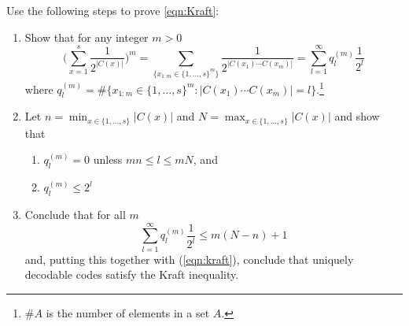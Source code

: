 \documentclass[11pt]{report}
\begin{document}
\begin{enumerate}[1.]
          Use the following steps to prove \ref{eqn:Kraft}:

          \begin{enumerate}

              \item Show that for any integer $m>0$
                    \begin{equation}
                        \label{eqn:kraft}
                        \big( \sum_{x=1}^{s}\frac{1}{2^{\left|C(x)\right|}}\big)^m
                        =
                        \sum_{\{x_{1:m}\in \{1,\ldots,s\}^m\}} \frac{1}{2^{\left|C(x_1)\cdots C(x_m)\right|}}
                        =
                        \sum_{l=1}^\infty q^{(m)}_l \frac{1}{2^l}
                    \end{equation}
                    where $q^{(m)}_l=\#\big\{x_{1:m}\in \{1,\ldots,s\}^m:\left|C(x_1)\cdots C(x_m)\right|=l\big\}$.\footnote{$\#A$ is the number of elements in a set $A$.}

              \item Let $n=\min_{x\in\{1,\ldots,s\}}|C(x)|$ and $N=\max_{x\in\{1,\ldots,s\}}|C(x)|$ and show that
                    \begin{enumerate}	\item $q^{(m)}_l=0$ unless $mn \leq l \leq mN$, and
                        \item $q^{(m)}_l \leq 2^l$
                    \end{enumerate}	\item Conclude that for all $m$
                    $$\sum_{l=1}^\infty q^{(m)}_l \frac{1}{2^l} \leq m(N-n)+1$$
                    and, putting this together with (\ref{eqn:kraft}), conclude that uniquely decodable codes satisfy the Kraft inequality.
          \end{enumerate}



\end{enumerate}
\end{document}
